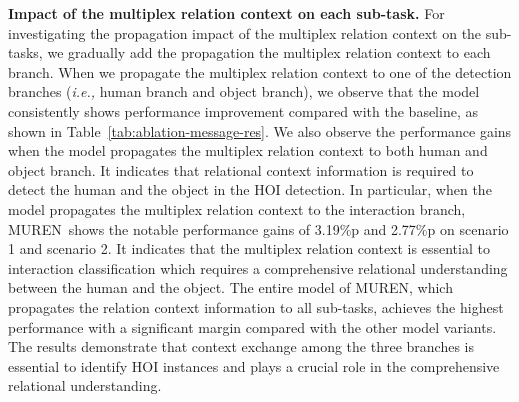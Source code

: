 \documentclass[10pt,twocolumn,letterpaper]{article}
\begin{document}
\noindent
\textbf{Impact of the multiplex relation context on each sub-task.}
For investigating the propagation impact of the multiplex relation context on the sub-tasks, we gradually add the propagation the multiplex relation context to each branch.
When we propagate the multiplex relation context to one of the detection branches (\textit{i.e.,} human branch and object branch), we observe that the model consistently shows performance improvement compared with the baseline, as shown in Table~\ref{tab:ablation-message-res}.
We also observe the performance gains when the model propagates the multiplex relation context to both human and object branch.
It indicates that relational context information is required to detect the human and the object in the HOI detection.
In particular, when the model propagates the multiplex relation context to the interaction branch, MUREN~shows the notable performance gains of 3.19\%p and 2.77\%p on scenario 1 and scenario 2.
It indicates that the multiplex relation context is essential to interaction classification which requires a comprehensive relational understanding between the human and the object.
The entire model of MUREN, which propagates the relation context information to all sub-tasks, achieves the highest performance with a significant margin compared with the other model variants.
The results demonstrate that context exchange among the three branches is essential to identify HOI instances and plays a crucial role in the comprehensive relational understanding.


\begin{table}[]
\begin{center}
\end{center}
\vspace{-0.4cm}
\caption{The impact of each relation context information on relational reasoning. The `ternary', `unary', and `pairwise' columns indicate the ternary, unary and pairwise relation context.}
\label{tab:ablation-multiplex-res}
\end{table}
\end{document}
